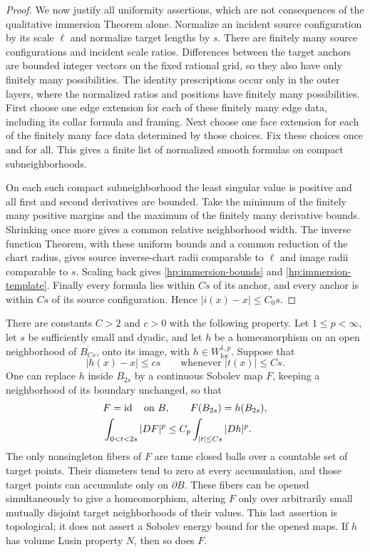 \begin{proof}
We now justify all uniformity assertions, which are not consequences
of the qualitative immersion Theorem alone.  Normalize an incident
source configuration by its scale $\ell$ and normalize target lengths
by $s$.  There are finitely many source configurations and incident
scale ratios.  Differences between the target anchors are bounded
integer vectors on the fixed rational grid, so they also have only
finitely many possibilities.  The identity prescriptions occur only
in the outer layers, where the normalized ratios and positions have
finitely many possibilities.  First choose one edge extension for each
of these finitely many edge data, including its collar formula and
framing.  Next choose one face extension for each of the finitely many
face data determined by those choices.  Fix these choices once and
for all.  This gives a finite list of normalized smooth formulas on
compact subneighborhoods.

On each such compact subneighborhood the least singular value is
positive and all first and second derivatives are bounded.  Take the
minimum of the finitely many positive margins and the maximum of the
finitely many derivative bounds.  Shrinking once more gives a common
relative neighborhood width.  The inverse function Theorem, with
these uniform bounds and a common reduction of the chart radius,
gives source inverse-chart radii comparable to $\ell$ and image radii
comparable to $s$.  Scaling back gives
\eqref{hp:immersion-bounds} and
\eqref{hp:immersion-template}.  Finally every formula lies within
$Cs$ of its anchor, and every anchor is within $Cs$ of its source
configuration.  Hence $|i(x)-x|\leq C_0s$.
\end{proof}

\begin{lemma}\label{hp:cutoff}
There are constants $C>2$ and $c>0$ with the following property.
Let $1\leq p<\infty$, let $s$ be sufficiently small and dyadic, and
let $h$ be a homeomorphism on an open neighborhood of
$\overline{B_{Cs}}$, onto its image, with
$h\in W^{1,p}_{\mathrm{loc}}$.  Suppose that
\begin{equation}\label{hp:cutoff-closeness}
 |h(x)-x|\leq cs\qquad\text{whenever }|t(x)|\leq Cs.
\end{equation}
One can replace $h$ inside $B_{2s}$ by a continuous Sobolev map $F$,
keeping a neighborhood of its boundary unchanged, so that
\begin{align}
 &F=\operatorname{id}\quad\text{on }B,
 \qquad F(B_{2s})=h(B_{2s}),\label{hp:cutoff-image}\\
 &\int_{0<t<2s}|DF|^p
 \leq C_p\int_{|t|\leq Cs}|Dh|^p.\label{hp:cutoff-energy}
\end{align}
The only nonsingleton fibers of $F$ are tame closed balls over a
countable set of target points.  Their diameters tend to zero at every
accumulation, and those target points can accumulate only on
$\partial B$.  These fibers can be opened simultaneously to give a
homeomorphism, altering $F$ only over arbitrarily small mutually
disjoint target neighborhoods of their values.  This last assertion
is topological; it does not assert a Sobolev energy bound for the
opened maps.  If $h$ has volume Lusin property $N$, then so does $F$.
\end{lemma}

